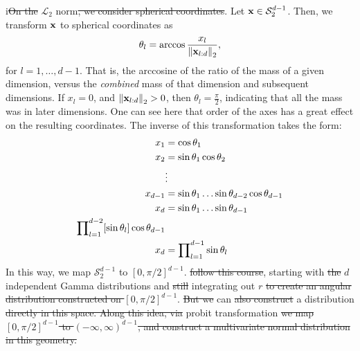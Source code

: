 i\st{On the} $\mathcal{L}_2$ norm\st{, we consider spherical coordinates}.  Let ${\bf x} \in \mathcal{S}_{2}^{d-1}$.
  Then, we transform ${\bf x}$ to spherical coordinates as
  \begin{equation*}
    \theta_l = \arccos\frac{x_l}{\left\lVert {\bf x}_{l:d} \right\rVert_{2}},
  \end{equation*}
  for $l = 1,\ldots, d-1$. That is, the arccosine of the ratio of the mass of a given dimension,
  versus the \emph{combined} mass of that dimension and subsequent dimensions.  If $x_l = 0$, and
  $\left\lVert {\bf x}_{l:d} \right\rVert_{2} > 0$, then $\theta_l = \frac{\pi}{2}$, indicating that all the mass was
  in later dimensions.  One can see here that order of the axes has a great effect on the resulting
  coordinates.  The inverse of this transformation takes the form:
  \begin{equation}
    \label{eqn:sperical}
    \begin{aligned}
      x_1 &= \cos\theta_1\\
      x_2 &= \sin\theta_1\cos\theta_2\\
      &\vdots\\
      x_{d-1} &= \sin\theta_1\ldots\sin\theta_{d-2}\cos\theta_{d-1}\\
      x_d &= \sin\theta_1\ldots\sin\theta_{d-1}\\
      {\small \prod}_{l = 1}^{d-2}[\sin\theta_{l}]\cos\theta_{d-1}\\
      x_d &= {\small \prod}_{l = 1}^{d-1}\sin\theta_l
    \end{aligned}
  \end{equation}
  In this way, we map $\mathcal{S}_2^{d-1}$ to $[0,\pi/2]^{d-1}$. 
  \cite{nunez2019} 
  \st{follow this course}, starting with \st{the} $d$ independent Gamma distributions and \st{still} integrating out
  $r$ \st{to create an angular distribution constructed on $[0,\pi/2]^{d-1}$}. \st{But we}  can \st{also construct} 
  a distribution  \st{directly in this space.  Along this idea, via} probit transformation  \st{we map
  $[0,\pi/2]^{d-1}$ to $(-\infty, \infty)^{d-1}$, and construct a multivariate normal distribution
  in this geometry.}

